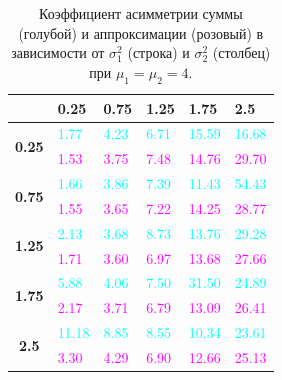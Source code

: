 \documentclass[specialist, substylefile = spbu.rtx,
subf,href,colorlinks=true, 12pt]{disser}
\begin{document}
\begin{table}[!hhh]
	\centering
	\caption{Коэффициент асимметрии суммы (голубой) и аппроксимации (розовый) в зависимости от $\sigma_{1}^{2}$ (строка) и $\sigma_{2}^{2}$ (столбец) при $\mu_{1} = \mu_{2} = 4$.}
	\label{tab7}
	\begin{tabular}{|c|l|l|l|l|l|}
		\hline
		& \textbf{0.25} & \textbf{0.75} & \textbf{1.25} & \textbf{1.75} & \textbf{2.5} \\ \hline
		\multirow{2}{*}{\textbf{0.25}} & \textcolor{cyan}{1.77}          & \textcolor{cyan}{4.23}          & \textcolor{cyan}{6.71}          & \textcolor{cyan}{15.59}         & \textcolor{cyan}{16.68}        \\ \cline{2-6} 
		& \textcolor{magenta}{1.53}          & \textcolor{magenta}{3.75}          & \textcolor{magenta}{7.48}          & \textcolor{magenta}{14.76}         & \textcolor{magenta}{29.70}        \\ \hline
		\multirow{2}{*}{\textbf{0.75}} & \textcolor{cyan}{1.66}          & \textcolor{cyan}{3.86}          & \textcolor{cyan}{7.39}          & \textcolor{cyan}{11.43}         & \textcolor{cyan}{54.43}        \\ \cline{2-6} 
		& \textcolor{magenta}{1.55}          & \textcolor{magenta}{3.65}          & \textcolor{magenta}{7.22}          & \textcolor{magenta}{14.25}         & \textcolor{magenta}{28.77}        \\ \hline
		\multirow{2}{*}{\textbf{1.25}} & \textcolor{cyan}{2.13}          & \textcolor{cyan}{3.68}          & \textcolor{cyan}{8.73}          & \textcolor{cyan}{13.76}         & \textcolor{cyan}{29.28}        \\ \cline{2-6} 
		& \textcolor{magenta}{1.71}          & \textcolor{magenta}{3.60}          & \textcolor{magenta}{6.97}          & \textcolor{magenta}{13.68}         & \textcolor{magenta}{27.66}        \\ \hline
		\multirow{2}{*}{\textbf{1.75}} & \textcolor{cyan}{5.88}          & \textcolor{cyan}{4.06}          & \textcolor{cyan}{7.50}          & \textcolor{cyan}{31.50}         & \textcolor{cyan}{24.89}        \\ \cline{2-6} 
		& \textcolor{magenta}{2.17}          & \textcolor{magenta}{3.71}          & \textcolor{magenta}{6.79}          & \textcolor{magenta}{13.09}         & \textcolor{magenta}{26.41}        \\ \hline
		\multirow{2}{*}{\textbf{2.5}}  & \textcolor{cyan}{11.18}         & \textcolor{cyan}{8.85}          & \textcolor{cyan}{8.55}          & \textcolor{cyan}{10.34}         & \textcolor{cyan}{23.61}        \\ \cline{2-6} 
		& \textcolor{magenta}{3.30}          & \textcolor{magenta}{4.29}          & \textcolor{magenta}{6.90}          & \textcolor{magenta}{12.66}         & \textcolor{magenta}{25.13}        \\ \hline
	\end{tabular}
\end{table}
\end{document}
